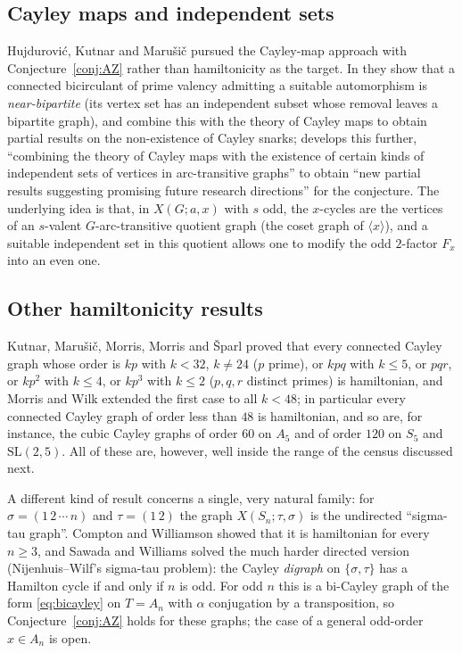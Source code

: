 \documentclass[11pt,a4paper]{article}
\theoremstyle{definition}
\theoremstyle{remark}
\newcommand{\X}[3]{X(#1;#2,#3)}
\begin{document}
\subsection{Cayley maps and independent sets}
Hujdurovi\'c, Kutnar and Maru\v{s}i\v{c} \cite{HKM13,HKM14} pursued the Cayley-map approach with Conjecture~\ref{conj:AZ} rather than hamiltonicity as the target.  In \cite{HKM13} they show that a connected bicirculant of prime valency admitting a suitable automorphism is \emph{near-bipartite} (its vertex set has an independent subset whose removal leaves a bipartite graph), and combine this with the theory of Cayley maps to obtain partial results on the non-existence of Cayley snarks; \cite{HKM14} develops this further, ``combining the theory of Cayley maps with the existence of certain kinds of independent sets of vertices in arc-transitive graphs'' to obtain ``new partial results suggesting promising future research directions'' for the conjecture.  The underlying idea is that, in $\X{G}{a}{x}$ with $s$ odd, the $x$-cycles are the vertices of an $s$-valent $G$-arc-transitive quotient graph (the coset graph of $\langle x\rangle$), and a suitable independent set in this quotient allows one to modify the odd $2$-factor $F_x$ into an even one.

\subsection{Other hamiltonicity results}
Kutnar, Maru\v{s}i\v{c}, Morris, Morris and \v{S}parl \cite{KMMMS12} proved that every connected Cayley graph whose order is $kp$ with $k<32$, $k\ne 24$ ($p$ prime), or $kpq$ with $k\le5$, or $pqr$, or $kp^2$ with $k\le 4$, or $kp^3$ with $k\le2$ ($p,q,r$ distinct primes) is hamiltonian, and Morris and Wilk \cite{MorrisWilk20} extended the first case to all $k<48$; in particular every connected Cayley graph of order less than $48$ is hamiltonian, and so are, for instance, the cubic Cayley graphs of order $60$ on $A_5$ and of order $120$ on $S_5$ and $\mathrm{SL}(2,5)$.  All of these are, however, well inside the range of the census discussed next.

A different kind of result concerns a single, very natural family: for $\sigma=(1\,2\,\cdots\,n)$ and $\tau=(1\,2)$ the graph $\X{S_n}{\tau}{\sigma}$ is the undirected ``sigma-tau graph''.  Compton and Williamson \cite{ComptonWilliamson93} showed that it is hamiltonian for every $n\ge3$, and Sawada and Williams \cite{SawadaWilliams20} solved the much harder directed version (Nijenhuis--Wilf's sigma-tau problem): the Cayley \emph{digraph} on $\{\sigma,\tau\}$ has a Hamilton cycle if and only if $n$ is odd.  For odd $n$ this is a bi-Cayley graph of the form \eqref{eq:bicayley} on $T=A_n$ with $\alpha$ conjugation by a transposition, so Conjecture~\ref{conj:AZ} holds for these graphs; the case of a general odd-order $x\in A_n$ is open.
\end{document}
